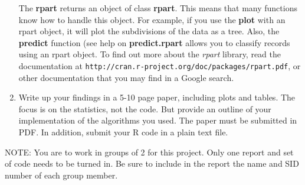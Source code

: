 \documentclass{article}
\def\SFunctionRef#1{\textbf{#1}}
\def\Rpackage#1{\textit{#1}}
\begin{document}
\begin{enumerate}
  The \SFunctionRef{rpart} returns an object of class
  \SFunctionRef{rpart}. This means that many functions know how to
  handle this object. For example, if you use the \SFunctionRef{plot}
  with an rpart object, it will plot the subdivisions of the data as a
  tree.  Also, the \SFunctionRef{predict} function (see help on
  \SFunctionRef{predict.rpart} allows you to classify records using an
  rpart object.  To find out more about the \Rpackage{rpart} library,
  read the documentation at
  \texttt{http://cran.r-project.org/doc/packages/rpart.pdf}, or other
  documentation that you may find in a Google search.

\item Write up your findings in a 5-10 page paper, including plots and
  tables.  The focus is on the statistics, not the code. But provide
  an outline of your implementation of the algorithms you used.  The
  paper must be submitted in PDF.  In addition, submit your R code in
  a plain text file.

\end{enumerate}

NOTE: You are to work in groups of 2 for this project.
Only one report and set of code needs to be turned in.
Be sure to include in the report the name and SID number 
of each group member.



\end{document}
